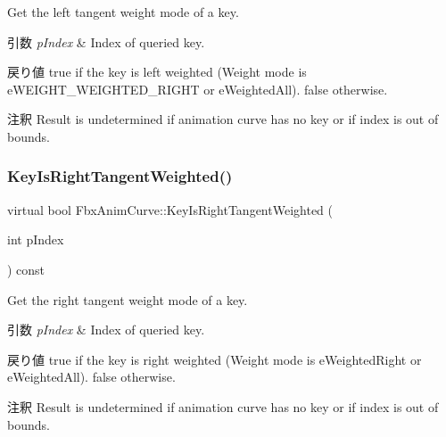 Get the left tangent weight mode of a key. 
\begin{DoxyParams}{引数}
{\em p\+Index} & Index of queried key. \\
\hline
\end{DoxyParams}
\begin{DoxyReturn}{戻り値}
{\ttfamily true} if the key is left weighted (Weight mode is e\+W\+E\+I\+G\+H\+T\+\_\+\+W\+E\+I\+G\+H\+T\+E\+D\+\_\+\+R\+I\+G\+HT or e\+Weighted\+All). {\ttfamily false} otherwise. 
\end{DoxyReturn}
\begin{DoxyRemark}{注釈}
Result is undetermined if animation curve has no key or if index is out of bounds. 
\end{DoxyRemark}
\mbox{\label{class_fbx_anim_curve_af82ac790cdd052063e2c8dbd45ea54ca}} 
\subsubsection{\texorpdfstring{Key\+Is\+Right\+Tangent\+Weighted()}{KeyIsRightTangentWeighted()}}
{\footnotesize\ttfamily virtual bool Fbx\+Anim\+Curve\+::\+Key\+Is\+Right\+Tangent\+Weighted (\begin{DoxyParamCaption}\item[{int}]{p\+Index }\end{DoxyParamCaption}) const\hspace{0.3cm}{\ttfamily [pure virtual]}}

Get the right tangent weight mode of a key. 
\begin{DoxyParams}{引数}
{\em p\+Index} & Index of queried key. \\
\hline
\end{DoxyParams}
\begin{DoxyReturn}{戻り値}
{\ttfamily true} if the key is right weighted (Weight mode is e\+Weighted\+Right or e\+Weighted\+All). {\ttfamily false} otherwise. 
\end{DoxyReturn}
\begin{DoxyRemark}{注釈}
Result is undetermined if animation curve has no key or if index is out of bounds. 
\end{DoxyRemark}
\mbox{\label{class_fbx_anim_curve_ac75a9aaa2edc08635c0a9fadbd628923}} 
